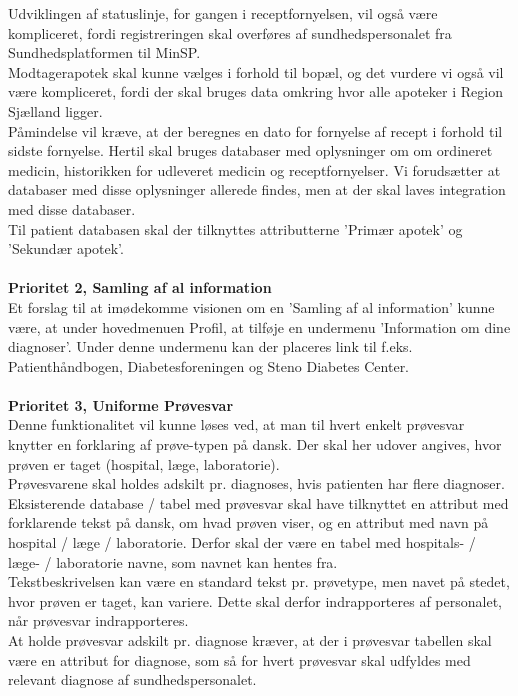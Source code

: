 Udviklingen af statuslinje, for gangen i receptfornyelsen, vil også være kompliceret, fordi registreringen skal overføres af sundhedspersonalet fra Sundhedsplatformen til MinSP.\\
Modtagerapotek skal kunne vælges i forhold til bopæl, og det vurdere vi også vil være kompliceret, fordi der skal bruges data omkring hvor alle apoteker i Region Sjælland ligger.\\
Påmindelse vil kræve, at der beregnes en dato for fornyelse af recept i forhold til sidste fornyelse. Hertil skal bruges databaser med oplysninger om om ordineret medicin, historikken for udleveret medicin og receptfornyelser. Vi forudsætter at databaser med disse oplysninger allerede findes, men at der skal laves integration med disse databaser.\\
Til patient databasen skal der tilknyttes attributterne 'Primær apotek' og 'Sekundær apotek'.
\\\\
\textbf{Prioritet 2, Samling af al information} \\
Et forslag til at imødekomme visionen om en 'Samling af al information' kunne være, at under hovedmenuen Profil, at tilføje en undermenu 'Information om dine diagnoser'. Under denne undermenu kan der placeres link til f.eks. Patienthåndbogen, Diabetesforeningen og Steno Diabetes Center.
\\\\ 
\textbf{Prioritet 3, Uniforme Prøvesvar} \\
Denne funktionalitet vil kunne løses ved, at man til hvert enkelt prøvesvar knytter en forklaring af prøve-typen på dansk. Der skal her udover angives, hvor prøven er taget (hospital, læge, laboratorie).\\
Prøvesvarene skal holdes adskilt pr. diagnoses, hvis patienten har flere diagnoser.\\
Eksisterende database / tabel med prøvesvar skal have tilknyttet en attribut med forklarende tekst på dansk, om hvad prøven viser, og en attribut med navn på hospital / læge / laboratorie. Derfor skal der være en tabel med hospitals- / læge- / laboratorie navne, som navnet kan hentes fra.\\ 
Tekstbeskrivelsen kan være en standard tekst pr. prøvetype, men navet på stedet, hvor prøven er taget, kan variere. Dette skal derfor indrapporteres af personalet, når prøvesvar indrapporteres. \\
At holde prøvesvar adskilt pr. diagnose kræver, at der i prøvesvar tabellen skal være en attribut for diagnose, som så for hvert prøvesvar skal udfyldes med relevant diagnose af sundhedspersonalet.\\
